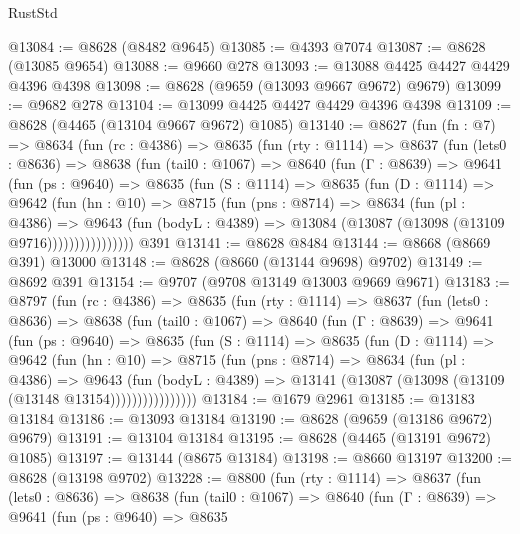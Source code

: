 \begin{lexlean}{RustStd}
\begin{coremodule}
@13084 := @8628 (@8482 @9645)
@13085 := @4393 @7074
@13087 := @8628 (@13085 @9654)
@13088 := @9660 @278
@13093 := @13088 @4425 @4427 @4429 @4396 @4398
@13098 := @8628 (@9659 (@13093 @9667 @9672) @9679)
@13099 := @9682 @278
@13104 := @13099 @4425 @4427 @4429 @4396 @4398
@13109 := @8628 (@4465 (@13104 @9667 @9672) @1085)
@13140 := @8627
    (fun (fn : @7) =>
    @8634
      (fun (rc : @4386) =>
      @8635
        (fun (rty : @1114) =>
        @8637
          (fun (lets0 : @8636) =>
          @8638
            (fun (tail0 : @1067) =>
            @8640
              (fun (Γ : @8639) =>
              @9641
                (fun (ps : @9640) =>
                @8635
                  (fun (S : @1114) =>
                  @8635
                    (fun (D : @1114) =>
                    @9642
                      (fun (hn : @10) =>
                      @8715
                        (fun (pns : @8714) =>
                        @8634
                          (fun (pl : @4386) =>
                          @9643
                            (fun (bodyL : @4389) =>
                            @13084 (@13087 (@13098 (@13109 @9716))))))))))))))))
    @391
@13141 := @8628 @8484
@13144 := @8668 (@8669 @391) @13000
@13148 := @8628 (@8660 (@13144 @9698) @9702)
@13149 := @8692 @391
@13154 := @9707 (@9708 @13149 @13003 @9669 @9671)
@13183 := @8797
    (fun (rc : @4386) =>
    @8635
      (fun (rty : @1114) =>
      @8637
        (fun (lets0 : @8636) =>
        @8638
          (fun (tail0 : @1067) =>
          @8640
            (fun (Γ : @8639) =>
            @9641
              (fun (ps : @9640) =>
              @8635
                (fun (S : @1114) =>
                @8635
                  (fun (D : @1114) =>
                  @9642
                    (fun (hn : @10) =>
                    @8715
                      (fun (pns : @8714) =>
                      @8634
                        (fun (pl : @4386) =>
                        @9643
                          (fun (bodyL : @4389) =>
                          @13141 (@13087 (@13098 (@13109 (@13148 @13154))))))))))))))))
@13184 := @1679 @2961
@13185 := @13183 @13184
@13186 := @13093 @13184
@13190 := @8628 (@9659 (@13186 @9672) @9679)
@13191 := @13104 @13184
@13195 := @8628 (@4465 (@13191 @9672) @1085)
@13197 := @13144 (@8675 @13184)
@13198 := @8660 @13197
@13200 := @8628 (@13198 @9702)
@13228 := @8800
    (fun (rty : @1114) =>
    @8637
      (fun (lets0 : @8636) =>
      @8638
        (fun (tail0 : @1067) =>
        @8640
          (fun (Γ : @8639) =>
          @9641
            (fun (ps : @9640) =>
            @8635

\end{coremodule}
\end{lexlean}
